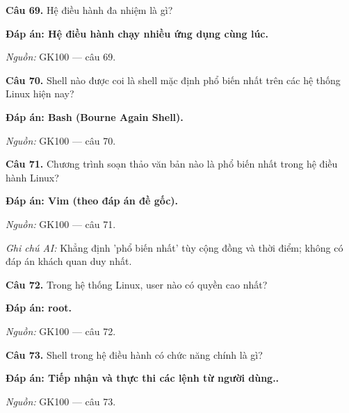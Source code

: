 \documentclass[11pt,a4paper]{article}
\begin{document}
\textbf{Câu 69.} Hệ điều hành đa nhiệm là gì?\par
{\color{answer}\textbf{Đáp án: Hệ điều hành chạy nhiều ứng dụng cùng lúc.}}\par
{\footnotesize\color{sourcegray}\textit{Nguồn:} GK100 — câu 69.\par}
\vspace{3pt}\par\noindent{\color{black!18}\rule{\linewidth}{0.3pt}}\par\medskip

\textbf{Câu 70.} Shell nào được coi là shell mặc định phổ biến nhất trên các hệ thống Linux hiện nay?\par
{\color{answer}\textbf{Đáp án: Bash (Bourne Again Shell).}}\par
{\footnotesize\color{sourcegray}\textit{Nguồn:} GK100 — câu 70.\par}
\vspace{3pt}\par\noindent{\color{black!18}\rule{\linewidth}{0.3pt}}\par\medskip

\textbf{Câu 71.} Chương trình soạn thảo văn bản nào là phổ biến nhất trong hệ điều hành Linux?\par
{\color{answer}\textbf{Đáp án: Vim (theo đáp án đề gốc).}}\par
{\footnotesize\color{sourcegray}\textit{Nguồn:} GK100 — câu 71.\par}
{\footnotesize\color{sourcegray}\textit{Ghi chú AI:} Khẳng định 'phổ biến nhất' tùy cộng đồng và thời điểm; không có đáp án khách quan duy nhất.\par}
\vspace{3pt}\par\noindent{\color{black!18}\rule{\linewidth}{0.3pt}}\par\medskip

\textbf{Câu 72.} Trong hệ thống Linux, user nào có quyền cao nhất?\par
{\color{answer}\textbf{Đáp án: root.}}\par
{\footnotesize\color{sourcegray}\textit{Nguồn:} GK100 — câu 72.\par}
\vspace{3pt}\par\noindent{\color{black!18}\rule{\linewidth}{0.3pt}}\par\medskip

\textbf{Câu 73.} Shell trong hệ điều hành có chức năng chính là gì?\par
{\color{answer}\textbf{Đáp án: Tiếp nhận và thực thi các lệnh từ người dùng..}}\par
{\footnotesize\color{sourcegray}\textit{Nguồn:} GK100 — câu 73.\par}
\vspace{3pt}\par\noindent{\color{black!18}\rule{\linewidth}{0.3pt}}\par\medskip
\end{document}
